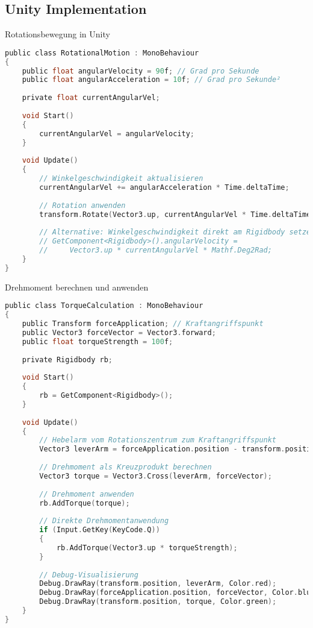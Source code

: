 \subsection{Unity Implementation}

\begin{code}{Rotationsbewegung in Unity}\\
\begin{lstlisting}[language=C, style=basesmol]
public class RotationalMotion : MonoBehaviour 
{
    public float angularVelocity = 90f; // Grad pro Sekunde
    public float angularAcceleration = 10f; // Grad pro Sekunde²
    
    private float currentAngularVel;
    
    void Start() 
    {
        currentAngularVel = angularVelocity;
    }
    
    void Update() 
    {
        // Winkelgeschwindigkeit aktualisieren
        currentAngularVel += angularAcceleration * Time.deltaTime;
        
        // Rotation anwenden
        transform.Rotate(Vector3.up, currentAngularVel * Time.deltaTime);
        
        // Alternative: Winkelgeschwindigkeit direkt am Rigidbody setzen
        // GetComponent<Rigidbody>().angularVelocity = 
        //     Vector3.up * currentAngularVel * Mathf.Deg2Rad;
    }
}
\end{lstlisting}
\end{code}

\begin{code}{Drehmoment berechnen und anwenden}\\
\begin{lstlisting}[language=C, style=basesmol]
public class TorqueCalculation : MonoBehaviour 
{
    public Transform forceApplication; // Kraftangriffspunkt
    public Vector3 forceVector = Vector3.forward;
    public float torqueStrength = 100f;
    
    private Rigidbody rb;
    
    void Start() 
    {
        rb = GetComponent<Rigidbody>();
    }
    
    void Update() 
    {
        // Hebelarm vom Rotationszentrum zum Kraftangriffspunkt
        Vector3 leverArm = forceApplication.position - transform.position;
        
        // Drehmoment als Kreuzprodukt berechnen
        Vector3 torque = Vector3.Cross(leverArm, forceVector);
        
        // Drehmoment anwenden
        rb.AddTorque(torque);
        
        // Direkte Drehmomentanwendung
        if (Input.GetKey(KeyCode.Q)) 
        {
            rb.AddTorque(Vector3.up * torqueStrength);
        }
        
        // Debug-Visualisierung
        Debug.DrawRay(transform.position, leverArm, Color.red);
        Debug.DrawRay(forceApplication.position, forceVector, Color.blue);
        Debug.DrawRay(transform.position, torque, Color.green);
    }
}
\end{lstlisting}
\end{code}

